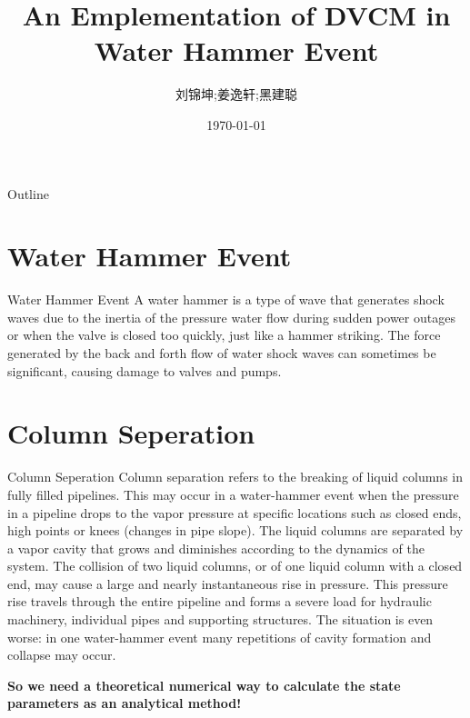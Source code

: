 \documentclass[UTF8]{ctexbeamer}
\title{An Emplementation of DVCM in Water Hammer Event}
\author{刘锦坤;姜逸轩;黑建聪}
\date{\today}
\begin{document}
\begin{frame}
    \titlepage
\end{frame}

\begin{frame}{Outline}
    \tableofcontents
\end{frame}

\section{Water Hammer Event}
\begin{frame}{Water Hammer Event}
    A water hammer is a type of wave that generates shock waves due to the inertia of the pressure water flow during sudden power outages or when the valve is closed too quickly, just like a hammer striking. The force generated by the back and forth flow of water shock waves can sometimes be significant, causing damage to valves and pumps.
\end{frame}

\section{Column Seperation}
\begin{frame}{Column Seperation}
    Column separation refers to the breaking of liquid columns in fully filled pipelines. This may occur in a water-hammer event when the pressure in a pipeline drops to the vapor pressure at specific locations such as closed ends, high points or knees (changes in pipe slope). The liquid columns are separated by a vapor cavity that grows and diminishes according to the dynamics of the system. The collision of two liquid columns, or of one liquid column with a closed end, may cause a large and nearly instantaneous rise in pressure. This pressure rise travels through the entire pipeline and forms a severe load for hydraulic machinery, individual pipes and supporting structures. The situation is even worse: in one water-hammer event many repetitions of cavity formation and collapse may occur.
    
    \textbf{So we need a theoretical numerical way to calculate the state parameters as an analytical method!}
\end{frame}

\end{document}
